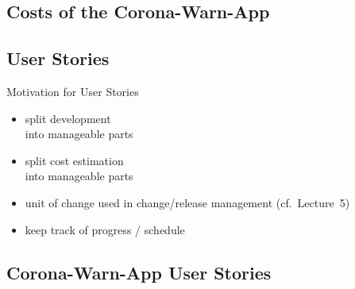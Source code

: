 \subsection{Costs of the Corona-Warn-App}
\begin{frame}{\insertsubsection{} }
	\centering{}
\end{frame}

\subsection{User Stories}
\begin{frame}{\insertsubsection}
	\begin{fancycolumns}
		\begin{note}{Motivation for User Stories}
			\begin{itemize}
				\item split development\\ into manageable parts
				\item split cost estimation\\ into manageable parts
				\item unit of change used in change/release management (cf.~Lecture~5)
				\item keep track of progress / schedule
			\end{itemize}
		\end{note}
		\nextcolumn
	\end{fancycolumns}
\end{frame}

\subsection{Corona-Warn-App User Stories}
\begin{frame}{\insertsubsection}
	\centering{}
\end{frame}
\begin{frame}{\insertsubsection}
	\centering{}
\end{frame}
\begin{frame}{\insertsubsection}
	\centering{}
\end{frame}

